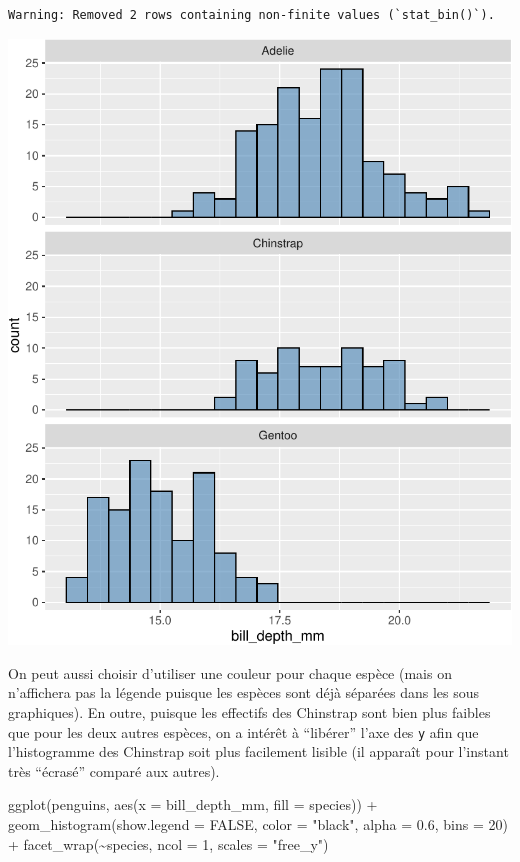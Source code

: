\documentclass[
  a4paper,
  DIV=11,
  numbers=noendperiod,
  oneside]{scrreprt}
\newenvironment{Shaded}{}{}
\newcommand{\AttributeTok}[1]{\textcolor[rgb]{0.84,0.23,0.29}{#1}}
\newcommand{\ConstantTok}[1]{\textcolor[rgb]{0.00,0.36,0.77}{#1}}
\newcommand{\DecValTok}[1]{\textcolor[rgb]{0.00,0.36,0.77}{#1}}
\newcommand{\FloatTok}[1]{\textcolor[rgb]{0.00,0.36,0.77}{#1}}
\newcommand{\FunctionTok}[1]{\textcolor[rgb]{0.44,0.26,0.76}{#1}}
\newcommand{\NormalTok}[1]{\textcolor[rgb]{0.14,0.16,0.18}{#1}}
\newcommand{\SpecialCharTok}[1]{\textcolor[rgb]{0.00,0.36,0.77}{#1}}
\newcommand{\StringTok}[1]{\textcolor[rgb]{0.01,0.18,0.38}{#1}}
\begin{document}
\begin{verbatim}
Warning: Removed 2 rows containing non-finite values (`stat_bin()`).
\end{verbatim}

\includegraphics{03-visualization_files/figure-pdf/unnamed-chunk-68-1.pdf}

On peut aussi choisir d'utiliser une couleur pour chaque espèce (mais on
n'affichera pas la légende puisque les espèces sont déjà séparées dans
les sous graphiques). En outre, puisque les effectifs des Chinstrap sont
bien plus faibles que pour les deux autres espèces, on a intérêt à
``libérer'' l'axe des \texttt{y} afin que l'histogramme des Chinstrap
soit plus facilement lisible (il apparaît pour l'instant très ``écrasé''
comparé aux autres).

\begin{Shaded}
\begin{Highlighting}[]
\FunctionTok{ggplot}\NormalTok{(penguins, }\FunctionTok{aes}\NormalTok{(}\AttributeTok{x =}\NormalTok{ bill\_depth\_mm, }\AttributeTok{fill =}\NormalTok{ species)) }\SpecialCharTok{+}
  \FunctionTok{geom\_histogram}\NormalTok{(}\AttributeTok{show.legend =} \ConstantTok{FALSE}\NormalTok{, }\AttributeTok{color =} \StringTok{"black"}\NormalTok{, }
                 \AttributeTok{alpha =} \FloatTok{0.6}\NormalTok{, }\AttributeTok{bins =} \DecValTok{20}\NormalTok{) }\SpecialCharTok{+}
  \FunctionTok{facet\_wrap}\NormalTok{(}\SpecialCharTok{\textasciitilde{}}\NormalTok{species, }\AttributeTok{ncol =} \DecValTok{1}\NormalTok{, }\AttributeTok{scales =} \StringTok{"free\_y"}\NormalTok{)}
\end{Highlighting}
\end{Shaded}
\end{document}
